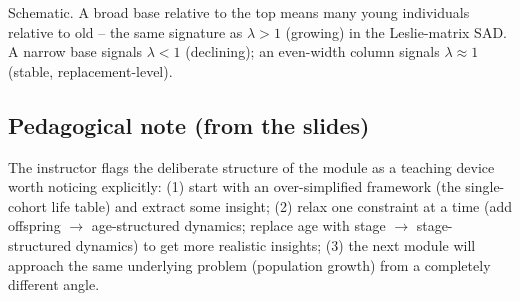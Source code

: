 \documentclass[11pt,a4paper]{article}
\begin{document}
\begin{figbox}[title={Age-pyramid shapes and what they say about $\lambda$}]
\centering
{}

\vspace{1mm}
\footnotesize Schematic. A broad base relative to the top means many young individuals relative to old -- the same signature as $\lambda>1$ (growing) in the Leslie-matrix SAD. A narrow base signals $\lambda<1$ (declining); an even-width column signals $\lambda\approx1$ (stable, replacement-level).
\end{figbox}

\subsection{Pedagogical note (from the slides)}
The instructor flags the deliberate structure of the module as a teaching device worth noticing explicitly: (1) start with an over-simplified framework (the single-cohort life table) and extract some insight; (2) relax one constraint at a time (add offspring $\to$ age-structured dynamics; replace age with stage $\to$ stage-structured dynamics) to get more realistic insights; (3) the next module will approach the same underlying problem (population growth) from a completely different angle.
\end{document}
